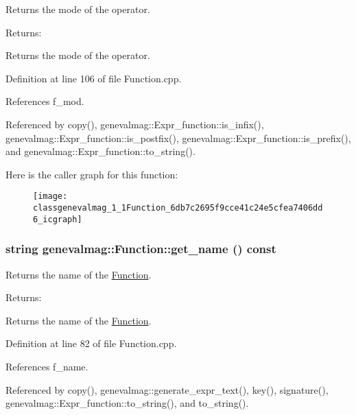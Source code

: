 Returns the mode of the operator. \begin{Desc}
\item[Returns:]\end{Desc}
Returns the mode of the operator. 

Definition at line 106 of file Function.cpp.

References f\_\-mod.

Referenced by copy(), genevalmag::Expr\_\-function::is\_\-infix(), genevalmag::Expr\_\-function::is\_\-postfix(), genevalmag::Expr\_\-function::is\_\-prefix(), and genevalmag::Expr\_\-function::to\_\-string().

Here is the caller graph for this function:\nopagebreak
\begin{figure}[H]
\begin{center}
\leavevmode
\texttt{[image: classgenevalmag\_1\_1Function\_6db7c2695f9cce41c24e5cfea7406dd6\_icgraph]}
\end{center}
\end{figure}
\hypertarget{classgenevalmag_1_1Function_ec65653267a5d4cb93f2ce7b5e1c542b}{
\subsubsection[{get\_\-name}]{\setlength{\rightskip}{0pt plus 5cm}string genevalmag::Function::get\_\-name () const}}
\label{classgenevalmag_1_1Function_ec65653267a5d4cb93f2ce7b5e1c542b}


Returns the name of the \hyperlink{classgenevalmag_1_1Function}{Function}. \begin{Desc}
\item[Returns:]\end{Desc}
Returns the name of the \hyperlink{classgenevalmag_1_1Function}{Function}. 

Definition at line 82 of file Function.cpp.

References f\_\-name.

Referenced by copy(), genevalmag::generate\_\-expr\_\-text(), key(), signature(), genevalmag::Expr\_\-function::to\_\-string(), and to\_\-string().

